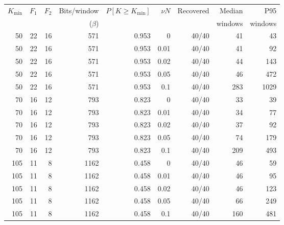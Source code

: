 \begin{tabular}{rrrrrrrrr}
\toprule
$K_{\min}$ & $F_1$ & $F_2$ & Bits/window & $P[K{\ge}K_{\min}]$ & $\nu N$ & Recovered & Median & P95\\
 & & & ($\beta$) & & & & windows & windows\\
\midrule
50 & 22 & 16 & 571 & 0.953 & 0 & 40/40 & 41 & 43\\
50 & 22 & 16 & 571 & 0.953 & 0.01 & 40/40 & 41 & 92\\
50 & 22 & 16 & 571 & 0.953 & 0.02 & 40/40 & 44 & 143\\
50 & 22 & 16 & 571 & 0.953 & 0.05 & 40/40 & 46 & 472\\
50 & 22 & 16 & 571 & 0.953 & 0.1 & 40/40 & 283 & 1029\\
\midrule
70 & 16 & 12 & 793 & 0.823 & 0 & 40/40 & 33 & 39\\
70 & 16 & 12 & 793 & 0.823 & 0.01 & 40/40 & 34 & 77\\
70 & 16 & 12 & 793 & 0.823 & 0.02 & 40/40 & 37 & 92\\
70 & 16 & 12 & 793 & 0.823 & 0.05 & 40/40 & 74 & 179\\
70 & 16 & 12 & 793 & 0.823 & 0.1 & 40/40 & 209 & 493\\
\midrule
105 & 11 & 8 & 1162 & 0.458 & 0 & 40/40 & 46 & 59\\
105 & 11 & 8 & 1162 & 0.458 & 0.01 & 40/40 & 46 & 95\\
105 & 11 & 8 & 1162 & 0.458 & 0.02 & 40/40 & 46 & 123\\
105 & 11 & 8 & 1162 & 0.458 & 0.05 & 40/40 & 66 & 249\\
105 & 11 & 8 & 1162 & 0.458 & 0.1 & 40/40 & 160 & 481\\
\bottomrule
\end{tabular}
